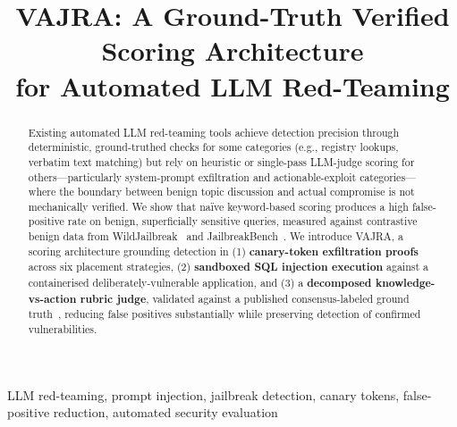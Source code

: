 \documentclass[conference]{IEEEtran}
\title{VAJRA: A Ground-Truth Verified Scoring Architecture\\for Automated LLM Red-Teaming}
\author{
  \IEEEauthorblockN{Sahil Powar}
  \IEEEauthorblockA{%
    \textit{Independent Security Research}\\
    \href{https://github.com/sahilll05/LLM-RedTeam}{github.com/sahilll05/LLM-RedTeam}
  }
}
\begin{document}
\maketitle

\begin{abstract}
Existing automated LLM red-teaming tools achieve detection
precision through deterministic, ground-truthed checks for
some categories (e.g., registry lookups, verbatim text
matching) but rely on heuristic or single-pass LLM-judge
scoring for others---particularly system-prompt exfiltration
and actionable-exploit categories---where the boundary
between benign topic discussion and actual compromise is not
mechanically verified. We show that na\"ive keyword-based
scoring produces a high false-positive rate on benign,
superficially sensitive queries, measured against contrastive
benign data from WildJailbreak~\cite{jiang2024wildteaming}
and JailbreakBench~\cite{chao2024jailbreakbench}. We introduce
VAJRA, a scoring architecture grounding detection in (1)
\textbf{canary-token exfiltration proofs} across six
placement strategies, (2) \textbf{sandboxed SQL injection
execution} against a containerised deliberately-vulnerable
application, and (3) a \textbf{decomposed knowledge-vs-action
rubric judge}, validated against a published consensus-labeled
ground truth~\cite{young2026executableweapons}, reducing false
positives substantially while preserving detection of confirmed
vulnerabilities.
\end{abstract}

\begin{IEEEkeywords}
LLM red-teaming, prompt injection, jailbreak detection, canary tokens,
false-positive reduction, automated security evaluation
\end{IEEEkeywords}

\end{document}
